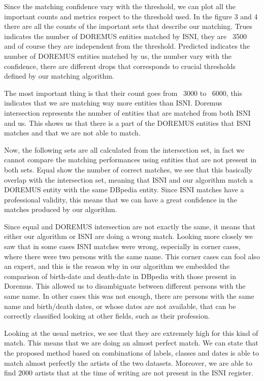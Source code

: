 \documentclass[paper=a4, fontsize=11pt]{scrartcl}
\begin{document}
Since the matching confidence vary with the threshold, we can plot all the important counts and metrics respect to the threshold used.
In the figure 3 and 4 there are all the counts of the important sets that describe our matching.
Trues indicates the number of DOREMUS entities matched by ISNI, they are ~3500 and of course they are independent from the threshold.
Predicted indicates the number of DOREMUS entities matched by us, the number vary with the confidence, there are different drops that corresponds to crucial thresholds defined by our matching algorithm.

The most important thing is that their count goes from ~3000 to ~6000, this indicates that we are matching way more entities than ISNI.
Doremus intersection represents the number of entities that are matched from both ISNI and us. This shows us that there is a part of the DOREMUS entities that ISNI matches and that we are not able to match.

Now, the following sets are all calculated from the intersection set, in fact we cannot compare the matching performances using entities that are not present in both sets.
Equal show the number of correct matches, we see that this basically overlap with the intersection set, meaning that ISNI and our algorithm match a DOREMUS entity with the same DBpedia entity. Since ISNI matches have a professional validity, this means that we can have a great confidence in the matches produced by our algorithm.

Since equal and DOREMUS intersection are not exactly the same, it means that either our algorithm or ISNI are doing a wrong match. Looking more closely we saw that in some cases ISNI matches were wrong, especially in corner cases, where there were two persons with the same name. This corner cases can fool also an expert, and this is the reason why in our algorithm we embedded the comparison of birth-date and death-date in DBpedia with those present in Doremus. This allowed us to disambiguate between different persons with the same name. In other cases this was not enough, there are persons with the same name and birth/death dates, or whose dates are not available, that can be correctly classified looking at other fields, such as their profession.

Looking at the usual metrics, we see that they are extremely high for this kind of match. This means that we are doing an almost perfect match.
We can state that the proposed method based on combinations of labels, classes and dates is able to match almost perfectly the artists of the two datasets. Moreover, we are able to find 2000 artists that at the time of writing are not present in the ISNI register.
\end{document}
